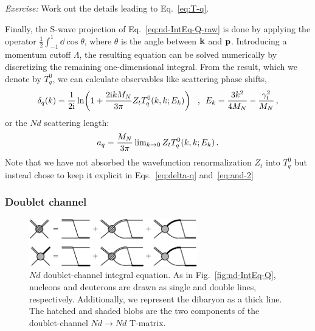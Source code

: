 \begin{prob}
\emph{Exercise:} Work out the details leading to Eq.~\eqref{eq:T-q}.
\end{prob}

Finally, the S-wave projection of Eq.~\eqref{eq:nd-IntEq-Q-raw} is done by 
applying the operator $\frac12\int_{-1}^{1}\dd\cos\theta$, where $\theta$ is 
the angle between $\mathbf{k}$ and $\mathbf{p}$.  Introducing a momentum cutoff $\Lambda$, 
the resulting equation can be solved numerically by discretizing the 
remaining one-dimensional integral.  From the result, which we denote by 
$T_q^0$, we can calculate observables like scattering phase shifts,
%
\begin{equation}
 \delta_{q}(k) = \frac{1}{2\ii}
 \ln\!\left(1+\frac{2\ii k\MN}{3\pi} Z_t T_q^0(k,k;E_k)\right)
 \mathtext{,} E_k = \frac{3k^2}{4\MN}-\frac{\gamt^2}{\MN} \,,
\label{eq:delta-q}
\end{equation}
%
or the $Nd$ scattering length:
%
\begin{equation}
 a_q = \frac{\MN}{3\pi}\lim\nolimits_{k\to0} Z_t T_q^0(k,k;E_k) \,.
\label{eq:and-2}
\end{equation}
%
Note that we have not absorbed the wavefunction renormalization $Z_t$ into 
$T_q^0$ but instead chose to keep it explicit in Eqs.~\eqref{eq:delta-q} 
and~\eqref{eq:and-2}

\subsubsection{Doublet channel}
\label{sec:EFT-NdDoublet}

\begin{figure}[htbp]
\centering
\includegraphics[clip,width=0.65\textwidth]{nd-IntEq-D}
\caption{$Nd$ doublet-channel integral equation.  As in 
Fig.~\ref{fig:nd-IntEq-Q}, nucleons and deuterons are drawn as single and 
double lines, respectively.  Additionally, we represent the \OneSNot dibaryon 
as a thick line.  The hatched and shaded blobs are the two components of the 
doublet-channel $Nd \to Nd$ T-matrix.}
\label{fig:nd-IntEq-D}
\end{figure}


